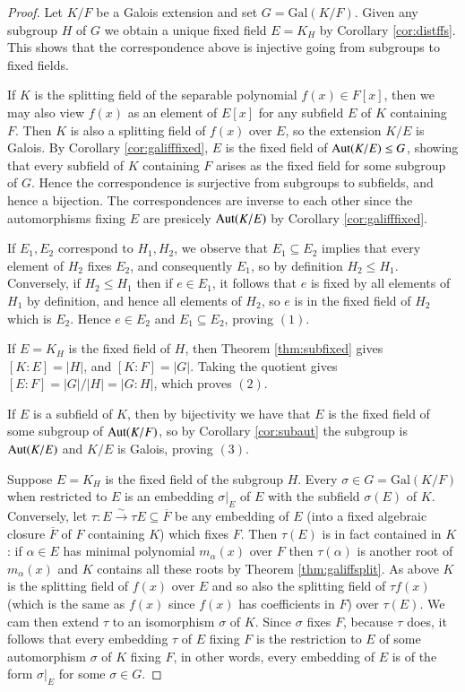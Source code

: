 \begin{proof}
    Let $K/F$ be a Galois extension and set $G = \text{Gal}(K/F)$. Given any subgroup $H$ of $G$ we obtain a unique fixed field $E = K_H$ by Corollary \ref{cor:distffs}. This shows that the correspondence above is injective going from subgroups to fixed fields.

    If $K$ is the splitting field of the separable polynomial $f(x) \in F[x]$, then we may also view $f(x)$ as an element of $E[x]$ for any subfield $E$ of $K$ containing $F$. Then $K$ is also a splitting field of $f(x)$ over $E$, so the extension $K/E$ is Galois. By Corollary \ref{cor:galifffixed}, $E$ is the fixed field of $\operatorname{Aut}(K/E)\leq G$, showing that every subfield of $K$ containing $F$ arises as the fixed field for some subgroup of $G$. Hence the correspondence is surjective from subgroups to subfields, and hence a bijection. The correspondences are inverse to each other since the automorphisms fixing $E$ are presicely $\operatorname{Aut}(K/E)$ by Corollary \ref{cor:galifffixed}.

    If $E_1,E_2$ correspond to $H_1,H_2$, we observe that $E_1 \subseteq E_2$ implies that every element of $H_2$ fixes $E_2$, and consequently $E_1$, so by definition $H_2 \leq H_1$. Conversely, if $H_2 \leq H_1$ then if $e \in E_1$, it follows that $e$ is fixed by all elements of $H_1$ by definition, and hence all elements of $H_2$, so $e$ is in the fixed field of $H_2$ which is $E_2$. Hence $e \in E_2$ and $E_1 \subseteq E_2$, proving $(1)$.

    If $E = K_H$ is the fixed field of $H$, then Theorem \ref{thm:subfixed} gives $[K:E] = |H|$, and $[K:F] = |G|$. Taking the quotient gives $[E:F] = |G|/|H| = |G:H|$, which proves $(2)$.

    If $E$ is a subfield of $K$, then by bijectivity we have that $E$ is the fixed field of some subgroup of $\operatorname{Aut}(K/F)$, so by Corollary \ref{cor:subaut} the subgroup is $\operatorname{Aut}(K/E)$ and $K/E$ is Galois, proving $(3)$.

    Suppose $E = K_H$ is the fixed field of the subgroup $H$. Every $\sigma \in G = \text{Gal}(K/F)$ when restricted to $E$ is an embedding $\sigma\vert_E$ of $E$ with the subfield $\sigma(E)$ of $K$. Conversely, let $\tau:E\xrightarrow{\sim}\tau{E}\subseteq \overline{F}$ be any embedding of $E$ (into a fixed algebraic closure $\overline{F}$ of $F$ containing $K$) which fixes $F$. Then $\tau(E)$ is in fact contained in $K$: if $\alpha \in E$ has minimal polynomial $m_{\alpha}(x)$ over $F$ then $\tau(\alpha)$ is another root of $m_{\alpha}(x)$ and $K$ contains all these roots by Theorem \ref{thm:galiffsplit}. As above $K$ is the splitting field of $f(x)$ over $E$ and so also the splitting field of $\tau f(x)$ (which is the same as $f(x)$ since $f(x)$ has coefficients in $F$) over $\tau(E)$. We cam then extend $\tau$ to an isomorphism $\sigma$ of $K$. Since $\sigma$ fixes $F$, because $\tau$ does, it follows that every embedding $\tau$ of $E$ fixing $F$ is the restriction to $E$ of some automorphism $\sigma$ of $K$ fixing $F$, in other words, every embedding of $E$ is of the form $\sigma\vert_E$ for some $\sigma \in G$.


\end{proof}
